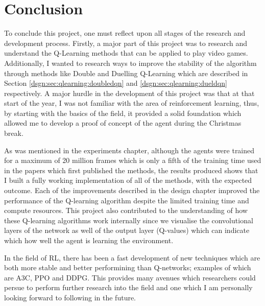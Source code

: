 \chapter{Conclusion}

To conclude this project, one must reflect upon all stages of the research and development process. Firstly, a major part of this project was to research and understand the Q-Learning methods that can be applied to play video games. Additionally, I wanted to research ways to improve the stability of the algorithm through methods like Double and Duelling Q-Learning which are described in Section \ref{dsgn:sec:qlearning:doubledqn} and \ref{dsgn:sec:qlearning:dueldqn} respectively. A major hurdle in the development of this project was that at that start of the year, I was not familiar with the area of reinforcement learning, thus, by starting with the basics of the field, it provided a solid foundation which allowed me to develop a proof of concept of the agent during the Christmas break.

As was mentioned in the experiments chapter, although the agents were trained for a maximum of 20 million frames which is only a fifth of the training time used in the papers which first published the methods, the results produced shows that I built a fully working implementation of all of the methods, with the expected outcome. Each of the improvements described in the design chapter improved the performance of the Q-learning algorithm despite the limited training time and compute resources. This project also contributed to the understanding of how these Q-learning algorithms work internally since we visualise the convolutional layers of the network as well of the output layer (Q-values) which can indicate which how well the agent is learning the environment.

In the field of RL, there has been a fast development of new techniques which are both more stable and better performining than Q-networks; examples of which are A3C\cite{mnih2016asynchronous}, PPO\cite{schulman2017proximal} and DDPG\cite{lillicrap2015continuous}. This provides many avenues which researchers could persue to perform further research into the field and one which I am personally looking forward to following in the future.